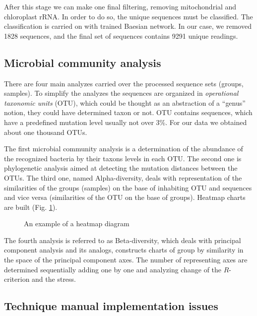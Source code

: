 \documentclass[a4paper]{jpconf}
\begin{document}
After this stage we can make one final filtering, removing mitochondrial and chloroplast rRNA. In order to do so, the unique sequences must be classified. The classification is carried on with trained Baesian network. In our case, we removed 1828 sequences, and the final set of sequences contains 9291 unique readings.


\subsection{Microbial community analysis}
\label{sec:biome-anl}

There are four main analyzes carried over the processed sequence sets (groups, samples). To simplify the analyzes the sequences are organized in \emph{operational taxonomic units} (OTU), which could be thought as an abstraction of a ``genus'' notion, they could have determined taxon or not. OTU contains sequences, which have a predefined mutation level usually not over 3\%. For our data we obtained about one thousand OTUs.

The first microbial community analysis is a determination of the abundance of the recognized bacteria by their taxons levels in each OTU. The second one is phylogenetic analysis aimed at detecting the mutation distances between the OTUs. The third one, named Alpha-diversity, deals with representation of the similarities of the groups (samples) on the base of inhabiting OTU and sequences and vice versa (similarities of the OTU on the base of groups). Heatmap charts are built (Fig. \ref{fig:heatmap-ex}).

\begin{figure}[bt]
  \caption{An example of a heatmap diagram}
  \label{fig:heatmap-ex}
\end{figure}

The fourth analysis is referred to as Beta-diversity, which deals with principal component analysis and its analogs, constructs charts of group by similarity in the space of the principal component axes. The number of representing axes are determined sequentially adding one by one and analyzing change of the $R$-criterion and the stress.

\subsection{Technique manual implementation issues}
\label{sec:finnotes}
\end{document}
